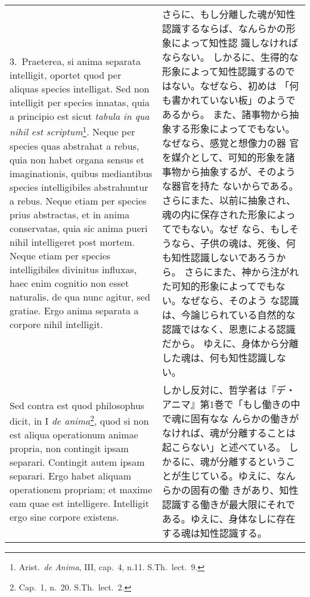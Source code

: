 \documentclass[10pt]{jsarticle} %
\begin{document}
\begin{longtable}{p{21em}p{21em}}
3.~{\sc Praeterea}, si anima separata intelligit,
 oportet quod per aliquas species intelligat. Sed non intelligit per
 species innatas, quia a principio est sicut {\it tabula in qua nihil est
 scriptum}\footnote{Arist.~{\it de Anima}, III, cap.~4, n.11. S.Th.~lect.~9.
}. Neque per species quas abstrahat a rebus, quia non habet
 organa sensus et imaginationis, quibus mediantibus species
 intelligibiles abstrahuntur a rebus. Neque etiam per species prius
 abstractas, et in anima conservatas, quia sic anima pueri nihil
 intelligeret post mortem. Neque etiam per species intelligibiles
 divinitus influxas, haec enim cognitio non esset naturalis, de qua nunc
 agitur, sed gratiae. Ergo anima separata a corpore nihil intelligit.


&

さらに、もし分離した魂が知性認識するならば、なんらかの形象によって知性認
 識しなければならない。
しかるに、生得的な形象によって知性認識するのではない。なぜなら、初めは
 「何も書かれていない板」のようであるから。
また、諸事物から抽象する形象によってでもない。なぜなら、感覚と想像力の器
 官を媒介として、可知的形象を諸事物から抽象するが、そのような器官を持た
 ないからである。
さらにまた、以前に抽象され、魂の内に保存された形象によってでもない。なぜ
 なら、もしそうなら、子供の魂は、死後、何も知性認識しないであろうから。
さらにまた、神から注がれた可知的形象によってでもない。なぜなら、そのよう
 な認識は、今論じられている自然的な認識ではなく、恩恵による認識だから。
ゆえに、身体から分離した魂は、何も知性認識しない。

\\



{\sc Sed contra est quod} philosophus dicit, in I
 {\it de anima}\footnote{Cap.~1, n.~20. S.Th.~lect.~2.}, quod si non est aliqua operationum animae propria, non
 contingit ipsam separari. Contingit autem ipsam separari. Ergo habet
 aliquam operationem propriam; et maxime eam quae est
 intelligere. Intelligit ergo sine corpore existens.


&

しかし反対に、哲学者は『デ・アニマ』第1巻で「もし働きの中で魂に固有なな
 んらかの働きがなければ、魂が分離することは起こらない」と述べている。
しかるに、魂が分離するということが生じている。ゆえに、なんらかの固有の働
 きがあり、知性認識する働きが最大限にそれである。ゆえに、身体なしに存在
 する魂は知性認識する。


\\



\end{longtable}
\end{document}
